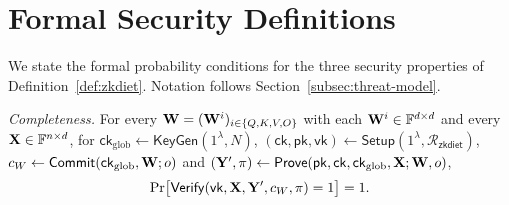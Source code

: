 \documentclass[runningheads]{llncs}
\begin{document}
\begin{table}[H]
\centering
\caption{\textbf{MLP\,+\,LayerNorm} costs for the Tiny configuration ($L{=}2$, $d{=}128$).}
\label{tab:mlp-costs}
\end{table}

\section{Formal Security Definitions}
\label{appx:security-defs}

We state the formal probability conditions for the three security properties of Definition~\ref{def:zkdiet}. Notation follows Section~\ref{subsec:threat-model}.

\smallskip
\noindent\emph{Completeness.} For every ${\mathbf{W}} = ({\mathbf{W}}^{i})_{i \in \{Q,K,V,O\}}$ with each ${\mathbf{W}}^{i} \in \mathbb{F}^{d \times d}$ and every ${\mathbf{X}} \in \mathbb{F}^{n \times d}$, for $\mathsf{ck}_{\mathrm{glob}} \leftarrow \mathsf{KeyGen}(1^{\lambda}, N)$, $(\mathsf{ck}, \mathsf{pk}, \mathsf{vk}) \leftarrow \mathsf{Setup}(1^{\lambda}, \mathcal{R}_{\mathsf{zkdiet}})$, $c_{W} \leftarrow \mathsf{Commit}(\mathsf{ck}_{\mathrm{glob}}, {\mathbf{W}}; o)$ and $({\mathbf{Y}}', \pi) \leftarrow \mathsf{Prove}(\mathsf{pk}, \mathsf{ck}, \mathsf{ck}_{\mathrm{glob}}, {\mathbf{X}}; {\mathbf{W}}, o)$,
\[
    \Pr\bigl[\mathsf{Verify}(\mathsf{vk}, {\mathbf{X}}, {\mathbf{Y}}', c_{W}, \pi) = 1\bigr] = 1 .
\]
\end{document}
